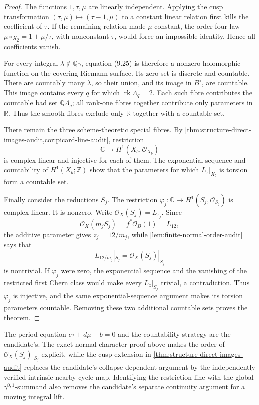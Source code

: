 \begin{proof}
The functions \(1,\tau,\mu\) are linearly independent.  Applying the cusp
transformation \((\tau,\mu)\mapsto(\tau-1,\mu)\) to a constant linear
relation first kills the coefficient of \(\tau\).  If the remaining
relation made \(\mu\) constant, the order-four law
\(\mu\circ g_2=1+\mu/\tau\), with nonconstant \(\tau\), would force an
impossible identity.  Hence all coefficients vanish.

For every integral \(\lambda\notin\mathbb Q\gamma\), equation (9.25) is
therefore a nonzero holomorphic function on the covering Riemann surface.
Its zero set is discrete and countable.  There are countably many
\(\lambda\), so their union, and its image in \(B^\circ\), are countable.
This image contains every \(q\) for which
\(\operatorname{rk}\Lambda_q=2\).  Each such fibre contributes the
countable bad set \(\mathbb Q\Lambda_q\); all rank-one fibres together
contribute only parameters in \(\mathbb R\).  Thus the smooth fibres
exclude only \(\mathbb R\) together with a countable set.

There remain the three scheme-theoretic special fibres.  By
\cref{thm:structure-direct-images-audit,cor:picard-line-audit}, restriction
\[
 \mathbb C\longrightarrow H^1(X_b,\mathcal O_{X_b})
\]
is complex-linear and injective for each of them.  The exponential sequence
and countability of \(H^1(X_b;\mathbb Z)\) show that the parameters for
which \(L_z|_{X_b}\) is torsion form a countable set.

Finally consider the reductions \(S_j\).  The restriction
\(\varphi_j:\mathbb C\to H^1(S_j,\mathcal O_{S_j})\) is complex-linear.
It is nonzero.  Write \(\mathcal O_X(S_j)=L_{z_j}\).  Since
\[
 \mathcal O_X(m_jS_j)=f^*\mathcal O_B(1)=L_{12},
\]
the additive parameter gives \(z_j=12/m_j\), while
\cref{lem:finite-normal-order-audit} says that
\[
 L_{12/m_j}|_{S_j}=\mathcal O_X(S_j)|_{S_j}
\]
is nontrivial.  If \(\varphi_j\) were zero, the exponential sequence and
the vanishing of the restricted first Chern class would make every
\(L_z|_{S_j}\) trivial, a contradiction.  Thus \(\varphi_j\) is
injective, and the same exponential-sequence argument makes its torsion
parameters countable.  Removing these two additional countable sets proves
the theorem.
\end{proof}

\begin{remark}
The period equation \(c\tau+d\mu-b=0\) and the countability strategy are
the candidate's.  The exact normal-character proof above makes the order of
\(\mathcal O_X(S_j)|_{S_j}\) explicit, while the cusp extension in
\cref{thm:structure-direct-images-audit} replaces the candidate's
collapse-dependent argument by the independently verified intrinsic
nearby-cycle map.  Identifying the restriction line with the global
\(\gamma^{0,1}\)-summand also removes the candidate's separate continuity
argument for a moving integral lift.
\end{remark}

